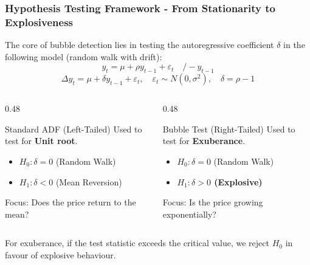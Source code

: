 \documentclass{beamer}
\begin{document}
\begin{frame}
\frametitle{Hypothesis Testing Framework - From Stationarity to Explosiveness}

    The core of bubble detection lies in testing the autoregressive coefficient $\delta$ in the following model (random walk with drift):
    \begin{equation*}
    y_t =  \mu + \rho y_{t-1} + \varepsilon_t  \quad /-y_{t-1}
     \end{equation*}
      \begin{equation*}
    \Delta y_t = \mu + \delta y_{t-1} + \varepsilon_t, \quad \varepsilon_t \sim N(0, \sigma^2), \quad \delta = \rho - 1
    \end{equation*}


    \begin{columns}[t]
        \begin{column}{0.48\textwidth}
            \begin{block}{Standard ADF (Left-Tailed)}
                Used to test for \textbf{Unit root}.
                \begin{itemize}
                    \item $H_0: \delta = 0$ (Random Walk)
                    \item $H_1: \delta < 0$ (Mean Reversion)
                \end{itemize}
                \vspace{0.2cm}
                \footnotesize{Focus: Does the price return to the mean?}
            \end{block}
        \end{column}

        \begin{column}{0.48\textwidth}
            \begin{block}{\alert{Bubble Test (Right-Tailed)}}
                Used to test for \textbf{Exuberance}.
                \begin{itemize}
                    \item $H_0: \delta = 0$ (Random Walk)
                    \item \textbf{$H_1: \delta > 0$ (Explosive)}
                \end{itemize}
                \vspace{0.2cm}
                \footnotesize{Focus: Is the price growing exponentially?}
            \end{block}
        \end{column}
    \end{columns}

    \vspace{0.5cm}
    \centering
    For exuberance, if the test statistic exceeds the critical value, we reject $H_0$ in favour of explosive behaviour.
\end{frame}
\end{document}
